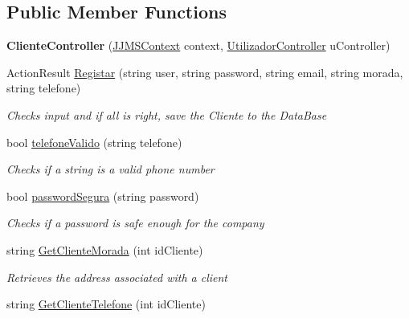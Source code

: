 \subsection*{Public Member Functions}
\begin{DoxyCompactItemize}
\item 
\mbox{\label{classmvc_j_j_m_s_1_1_controllers_1_1_cliente_controller_a55a36c3b859c2bbabf552b1526c18cef}} 
{\bfseries Cliente\+Controller} (\mbox{\hyperlink{classmvc_j_j_m_s_1_1_data_1_1_j_j_m_s_context}{J\+J\+M\+S\+Context}} context, \mbox{\hyperlink{classmvc_j_j_m_s_1_1_controllers_1_1_utilizador_controller}{Utilizador\+Controller}} u\+Controller)
\item 
Action\+Result \mbox{\hyperlink{classmvc_j_j_m_s_1_1_controllers_1_1_cliente_controller_a31325ea0231ffa6f09996a9f61f1731b}{Registar}} (string user, string password, string email, string morada, string telefone)
\begin{DoxyCompactList}\small\item\em Checks input and if all is right, save the Cliente to the Data\+Base \end{DoxyCompactList}\item 
bool \mbox{\hyperlink{classmvc_j_j_m_s_1_1_controllers_1_1_cliente_controller_a55f13fda1a4342595d427b8bfc9a2978}{telefone\+Valido}} (string telefone)
\begin{DoxyCompactList}\small\item\em Checks if a string is a valid phone number \end{DoxyCompactList}\item 
bool \mbox{\hyperlink{classmvc_j_j_m_s_1_1_controllers_1_1_cliente_controller_a0027e8277cd9552a1122e12547ec10c6}{password\+Segura}} (string password)
\begin{DoxyCompactList}\small\item\em Checks if a password is safe enough for the company \end{DoxyCompactList}\item 
string \mbox{\hyperlink{classmvc_j_j_m_s_1_1_controllers_1_1_cliente_controller_a6925f8c7f2234512eceb9e027c987ca9}{Get\+Cliente\+Morada}} (int id\+Cliente)
\begin{DoxyCompactList}\small\item\em Retrieves the address associated with a client \end{DoxyCompactList}\item 
string \mbox{\hyperlink{classmvc_j_j_m_s_1_1_controllers_1_1_cliente_controller_ac50b76017495e8df860bffad1e7ea29f}{Get\+Cliente\+Telefone}} (int id\+Cliente)

\end{DoxyCompactItemize}
